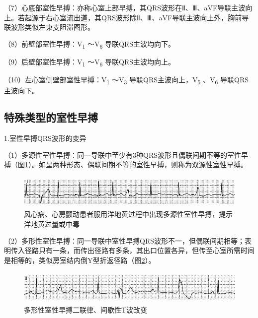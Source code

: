 （7）心底部室性早搏：亦称心室上部早搏，其QRS波形在Ⅱ、Ⅲ、aVF导联主波向上。若起源于右心室流出道，其QRS波形除Ⅱ、Ⅲ、aVF导联主波向上外，胸前导联波形类似左束支阻滞图形。

（8）前壁部室性早搏：V\textsubscript{1} ～V\textsubscript{6}
导联QRS主波均向下。

（9）后壁部室性早搏：V\textsubscript{1} ～V\textsubscript{6}
导联QRS主波均向上。

（10）左心室侧壁部室性早搏：V\textsubscript{1} ～V\textsubscript{3}
导联QRS主波向上，V\textsubscript{5} 、V\textsubscript{6}
导联QRS主波向下。

\protect\hypertarget{text00018.htmlux5cux23subid153}{}{}

\subsection{特殊类型的室性早搏}

1.室性早搏QRS波形的变异

（1）多源性室性早搏：同一导联中至少有3种QRS波形且偶联间期不等的室性早搏（图\ref{fig11-20}）。如呈两种形态、偶联间期不等的室性早搏，则称为双源性室性早搏。

\begin{figure}[!htbp]
 \centering
 \includegraphics[width=5.58333in,height=0.64583in]{./images/Image00180.jpg}
 \captionsetup{justification=centering}
 \caption{风心病、心房颤动患者服用洋地黄过程中出现多源性室性早搏，提示洋地黄过量或中毒}
 \label{fig11-20}
  \end{figure} 

（2）多形性室性早搏：同一导联中室性早搏QRS波形不一，但偶联间期相等；表明传入径路只有一条，而传出径路有多条，其出口位置各异，但传至心室所需时间是相等的，类似房室结内倒Y型折返径路（图\ref{fig11-21}）。

\begin{figure}[!htbp]
 \centering
 \includegraphics[width=5.58333in,height=0.64583in]{./images/Image00181.jpg}
 \captionsetup{justification=centering}
 \caption{多形性室性早搏二联律、间歇性T波改变}
 \label{fig11-21}
  \end{figure} 

